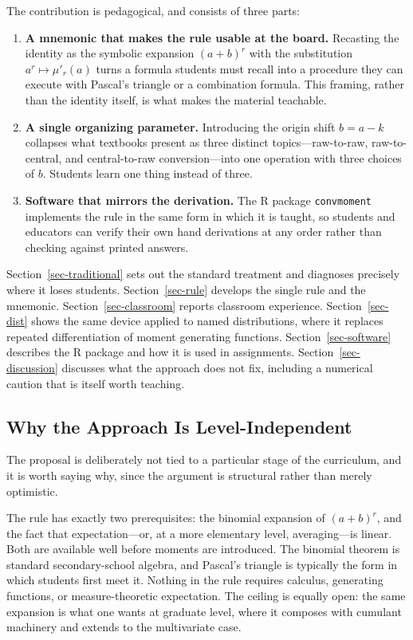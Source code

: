 \documentclass[
  12pt]{article}
\begin{document}
The contribution is pedagogical, and consists of three parts:

\begin{enumerate}
\item \textbf{A mnemonic that makes the rule usable at the board.} Recasting the identity as the symbolic expansion $(a+b)^r$ with the substitution $a^r \mapsto \mu'_r(a)$ turns a formula students must recall into a procedure they can execute with Pascal's triangle or a combination formula. This framing, rather than the identity itself, is what makes the material teachable.
\item \textbf{A single organizing parameter.} Introducing the origin shift $b = a - k$ collapses what textbooks present as three distinct topics---raw-to-raw, raw-to-central, and central-to-raw conversion---into one operation with three choices of $b$. Students learn one thing instead of three.
\item \textbf{Software that mirrors the derivation.} The R package \texttt{convmoment} implements the rule in the same form in which it is taught, so students and educators can verify their own hand derivations at any order rather than checking against printed answers.
\end{enumerate}

Section~\ref{sec-traditional} sets out the standard treatment and diagnoses precisely where it loses students. Section~\ref{sec-rule} develops the single rule and the mnemonic. Section~\ref{sec-classroom} reports classroom experience. Section~\ref{sec-dist} shows the same device applied to named distributions, where it replaces repeated differentiation of moment generating functions. Section~\ref{sec-software} describes the R package and how it is used in assignments. Section~\ref{sec-discussion} discusses what the approach does not fix, including a numerical caution that is itself worth teaching.

\subsection{Why the Approach Is Level-Independent}\label{sec-levels}

The proposal is deliberately not tied to a particular stage of the curriculum, and it is worth saying why, since the argument is structural rather than merely optimistic.

The rule has exactly two prerequisites: the binomial expansion of $(a+b)^r$, and the fact that expectation---or, at a more elementary level, averaging---is linear. Both are available well before moments are introduced. The binomial theorem is standard secondary-school algebra, and Pascal's triangle is typically the form in which students first meet it. Nothing in the rule requires calculus, generating functions, or measure-theoretic expectation. The ceiling is equally open: the same expansion is what one wants at graduate level, where it composes with cumulant machinery and extends to the multivariate case.
\end{document}
